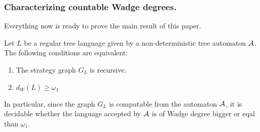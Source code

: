 \subsubsection*{Characterizing countable Wadge degrees.}
\label{sec:the main result}
Everything now is ready to prove the main result of this paper.
\begin{theorem}\label{theorem:main}
Let $L$ be a regular tree language given by a non-deterministic tree automaton ${\mathcal A}$. The following conditions are equivalent:
\begin{enumerate}
\item The strategy graph $G_L$ is recursive.
\item $d_W(L) \geq \omega_1$
\end{enumerate}
In particular, since the graph $G_L$ is computable from the automaton ${\mathcal A}$, it is decidable whether the language accepted by ${\mathcal A}$ is of Wadge degree bigger or eqal than $\omega_1$.  
\end{theorem}

